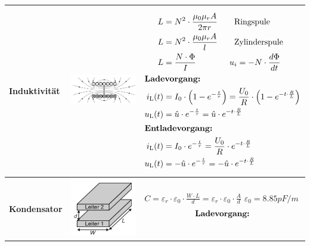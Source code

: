\begin{longtable}{|>{\bfseries}p{3cm}|c|p{10cm}|}
    \\ \hline
    Induktivität
    & \includegraphics[width=4cm, valign=t]{images/induktivitaet.png}
    & {\begin{align*}
    		L &=N^2\cdot\frac{\mu_{0}\mu_{r}A}{2\pi r} \qquad \text{Ringspule} \\
    		L &=N^2\cdot\frac{\mu_{0}\mu_{r}A}{l} \qquad \text{Zylinderspule} \\
    		L &=\frac{N\cdot\Phi}{I} \qquad \qquad u_{i} =-N\cdot\frac{d\Phi}{dt}\\
    		\intertext{\textbf{Ladevorgang:}}
    		i_{\mathrm{L}} (t) &= I_0 \cdot \left( 1 - e^{-\frac{t}{\tau}}\right) = \frac{U_0}{R} \cdot \left( 1 -e^{-t\cdot \frac{R}{L}}\right) \\
    		u_{\mathrm{L}} (t) &= \hat u \cdot e^{-\frac{t}{\tau}} = \hat u \cdot e^{-t \cdot\frac{R}{L}}\\
    		\intertext{\textbf{Entladevorgang:}}
    		i_{\mathrm{L}} (t) &= I_0 \cdot e^{- \frac{t}{\tau}} = \frac{U_0}{R} \cdot e^{- t \cdot\frac{R}{L}}\\
    		u_{\mathrm{L}} (t) &= - \hat u \cdot e^{- \frac{t}{\tau}} = - \hat u \cdot e^{- t \cdot\frac{R}{L}}
    	\end{align*}
    }
    \\ \hline
    Kondensator
    & \includegraphics[width=4cm, valign=t]{images/kapazitaetswert.png}
    & {$C=\varepsilon_{r}\cdot \varepsilon_{0}\cdot \frac{W\cdot L}{d}=\varepsilon_{r}\cdot \varepsilon_{0}\cdot \frac{A}{d}$ \qquad $\varepsilon_{0}= 8.85 pF/m$\newline
       \newline
       \begin{align*}
           \intertext{\textbf{Ladevorgang:}}

\end{align*}}
\end{longtable}

